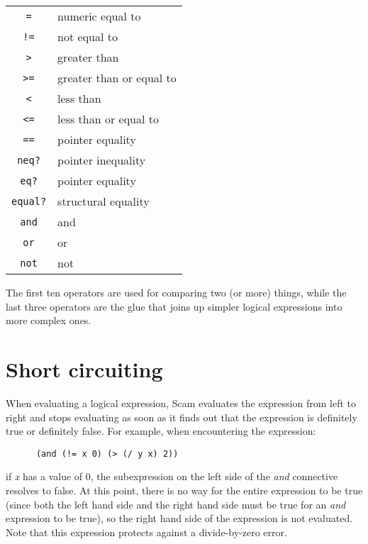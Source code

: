 \begin{center}
\begin{tabular}{cl}%
    {\tt =}     & numeric equal to \\
    {\tt !=}    & not equal to \\
    {\tt >}     & greater than \\
    {\tt >=}    & greater than or equal to \\
    {\tt <}     & less than \\
    {\tt <=}    & less than or equal to \\
    {\tt ==}    & pointer equality \\
    {\tt neq?}  & pointer inequality \\
    {\tt eq?}   & pointer equality \\
    {\tt equal?}& structural equality \\
    {\tt and}   & and \\
    {\tt or}    & or \\
    {\tt not}   & not \\
\end{tabular}
\end{center}

The first ten operators are used for comparing two  (or more) things,
while the last three operators are the glue that joins up simpler
logical expressions into more complex ones.

\section{Short circuiting}

When evaluating a logical expression,
Scam evaluates the expression from left to right and
stops evaluating as soon as it finds out that the expression
is definitely true or definitely false.
For example, when encountering the expression:

\begin{verbatim}
      (and (!= x 0) (> (/ y x) 2))
\end{verbatim}

if {\it x} has a value of 0, the subexpression on the left side of the
{\it and}
connective resolves to false. At this point, there is no way for the
entire expression to be true (since both the left hand side and the right
hand side must be true for an
{\it and}
expression to be true), so the right
hand side of the expression is not evaluated. Note that this expression
protects against a divide-by-zero error.

